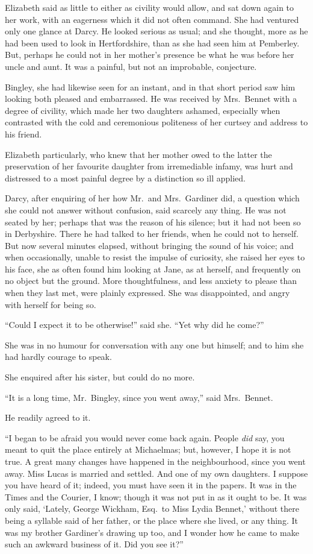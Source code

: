 Elizabeth said as little to either as civility would allow,
and sat down again to her work, with an eagerness which
it did not often command. She had ventured only one
glance at Darcy. He looked serious as usual; and she
thought, more as he had been used to look in Hertfordshire,
than as she had seen him at Pemberley. But, perhaps
he could not in her mother’s presence be what he was
before her uncle and aunt. It was a painful, but not an
improbable, conjecture.

Bingley, she had likewise seen for an instant, and in
that short period saw him looking both pleased and
embarrassed. He was received by Mrs.\ Bennet with
a degree of civility, which made her two daughters
ashamed, especially when contrasted with the cold and
ceremonious politeness of her curtsey and address to his
friend.

Elizabeth particularly, who knew that her mother owed
to the latter the preservation of her favourite daughter
from irremediable infamy, was hurt and distressed to
a most painful degree by a distinction so ill applied.

Darcy, after enquiring of her how Mr.\ and Mrs.\ Gardiner
did, a question which she could not answer without confusion,
said scarcely any thing. He was not seated by her;
perhaps that was the reason of his silence; but it had
not been so in Derbyshire. There he had talked to her
friends, when he could not to herself. But now several
minutes elapsed, without bringing the sound of his voice;
and when occasionally, unable to resist the impulse of
curiosity, she raised her eyes to his face, she as often
found him looking at Jane, as at herself, and frequently
on no object but the ground. More thoughtfulness, and
less anxiety to please than when they last met, were
plainly expressed. She was disappointed, and angry with
herself for being so.

“Could I expect it to be otherwise!” said she. “Yet
why did he come?”

She was in no humour for conversation with any one
but himself; and to him she had hardly courage to speak.

She enquired after his sister, but could do no more.

“It is a long time, Mr.\ Bingley, since you went away,”
said Mrs.\ Bennet.

He readily agreed to it.

“I began to be afraid you would never come back
again. People \textit{did} say, you meant to quit the place entirely
at Mich\-aelmas; but, however, I hope it is not true.
A great many changes have happened in the neighbourhood,
since you went away. Miss Lucas is married and
settled. And one of my own daughters. I suppose you
have heard of it; indeed, you must have seen it in the
papers. It was in the Times and the Courier, I know;
though it was not put in as it ought to be. It was only said,
‘Lately, George Wickham, Esq.\ to Miss Lydia Bennet,’
without there being a syllable said of her father, or the
place where she lived, or any thing. It was my brother
Gardiner’s drawing up too, and I wonder how he came
to make such an awkward business of it. Did you see it?”

